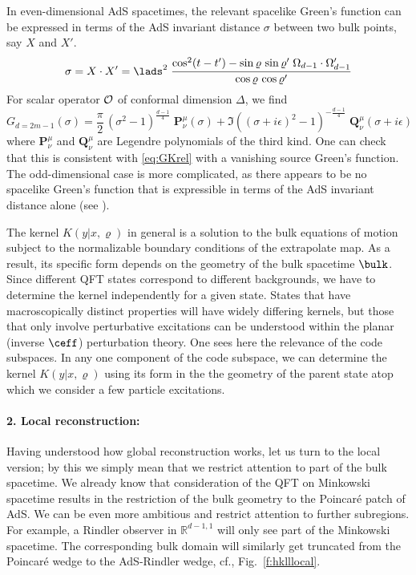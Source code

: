\documentclass[12pt,openany]{book}
\begin{document}
In even-dimensional AdS spacetimes, the relevant spacelike Green's function can be expressed in terms of the AdS invariant distance $\sigma$ between two bulk points, say $X$ and $X'$.
%
\begin{equation}
\sigma = X\cdot X' = \lads^2 \; \frac{\cos^2(t-t') - \sin\varrho \,\sin\varrho'\; \Omega_{d-1} \cdot \Omega'_{d-1}}{\cos\varrho \, \cos\varrho'}
\label{eq:adsinvd}
\end{equation}
%
For scalar operator ${\cal O}$ of conformal dimension $\Delta$, we find \cite{Heemskerk:2012mq}
%
\begin{equation}
G_{d=2m-1}(\sigma) = \frac{\pi}{2}\, (\sigma^2-1)^\frac{d-1}{4}\; \mathbf{P}^\mu_{\nu}(\sigma) + \Im\left( (\sigma+i\epsilon)^2 - 1\right)^{-\frac{d-1}{4}}\;  \mathbf{Q}^\mu_{\nu}(\sigma + i\epsilon)
\label{eq:eadsG}
\end{equation}
%
where $\mathbf{P}^\mu_\nu$ and $\mathbf{Q}^\mu_\nu$ are Legendre polynomials of the third kind. One can check that this is consistent with \eqref{eq:GKrel} with a  vanishing source Green's function. The odd-dimensional case is more complicated, as there appears to be no spacelike Green's function that is expressible in terms of the AdS invariant distance alone (see \cite{Heemskerk:2012mq}).

The kernel $K(y|x,\varrho)$ in general is a solution to the bulk equations of motion subject to the normalizable boundary conditions of the extrapolate map. As a result,  its specific form depends on the geometry of the bulk spacetime $\bulk$. Since different QFT states correspond to different  backgrounds, we have to determine the kernel independently for a given state. States that have macroscopically distinct properties will have widely differing kernels, but those that only involve perturbative excitations can be understood within the planar  (inverse $\ceff$) perturbation theory.
One sees here the relevance of the code subspaces. In any one component of the code subspace, we can determine the kernel $K(y|x,\varrho)$  using its form in the the geometry of the parent state atop which we consider a few particle excitations.

\paragraph{2. Local reconstruction:} Having understood how global reconstruction works, let us turn to the local version; by this we simply mean that we restrict attention to part of the bulk spacetime. We already know that consideration of the QFT on Minkowski spacetime results in the restriction of the bulk geometry to the Poincar\'e patch of AdS. We can be even more ambitious and restrict attention to further subregions. For example, a Rindler observer in ${\mathbb R}^{d-1,1}$ will only see part of the Minkowski spacetime. The corresponding bulk domain will similarly get truncated from the Poincar\'e wedge to the AdS-Rindler wedge, cf., Fig.~\ref{f:hklllocal}.
\end{document}
